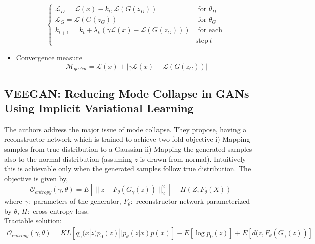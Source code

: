 \begin{itemize}
$$
\left\{\begin{array}{ll}{\mathcal{L}_{D}=\mathcal{L}(x)-k_{t}, \mathcal{L}\left(G\left(z_{D}\right)\right)} & {\text { for } \theta_{D}} \\ {\mathcal{L}_{G}=\mathcal{L}\left(G\left(z_{G}\right)\right)} & {\text { for } \theta_{G}} \\ {k_{t+1}=k_{t}+\lambda_{k}\left(\gamma \mathcal{L}(x)-\mathcal{L}\left(G\left(z_{G}\right)\right)\right)} & {\text { for each }} \\
{} & {\text{step}\  t}\end{array}\right.
$$
\item Convergence measure
$$
\mathcal{M}_{g l o b a l}=\mathcal{L}(x)+\left|\gamma \mathcal{L}(x)-\mathcal{L}\left(G\left(z_{G}\right)\right)\right|
$$
\end{itemize}


\subsection*{VEEGAN: Reducing Mode Collapse in GANs Using Implicit Variational Learning \citep{veegan}}
The authors address the major issue of mode collapse. They propose, having a reconstructor network which is trained to achieve two-fold objective i) Mapping samples from true distribution to a Gaussian ii) Mapping the generated samples also to the normal distribution (assuming $z$ is drawn from normal). Intuitively this is achievable only when the generated samples follow true distribution. The objective is given by,
$$\mathcal{O}_{entropy}(\gamma, \theta) = E[\parallel z - F_{\theta}(G_{\gamma}(z)) \parallel_2^2] + H(Z, F_{\theta}(X))$$
where $\gamma:$ parameters of the generator, $F_{\theta}:$ reconstructor network parameterized by $\theta$, $H:$ cross entropy loss.  \\
Tractable solution: 
\begin{equation*}
    \begin{aligned}
    \mathcal{O}_{entropy}(\gamma, \theta) =  KL [q_{\gamma}(x|z) p_0(z) || p_{\theta}(z|x) p(x)] 
    - E[\log p_0 (z)] + E[d( z , F_{\theta}(G_{\gamma}(z))]
    \end{aligned}{}
\end{equation*}{}



